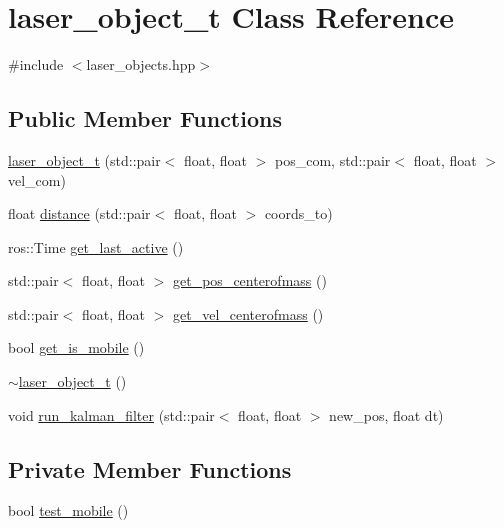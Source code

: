 \hypertarget{classlaser__object__t}{}\section{laser\+\_\+object\+\_\+t Class Reference}
\label{classlaser__object__t}


{\ttfamily \#include $<$laser\+\_\+objects.\+hpp$>$}

\subsection*{Public Member Functions}
\begin{DoxyCompactItemize}
\item 
\hyperlink{classlaser__object__t_a86fb4dc51298aedc38f4dea202e86d94}{laser\+\_\+object\+\_\+t} (std\+::pair$<$ float, float $>$ pos\+\_\+com, std\+::pair$<$ float, float $>$ vel\+\_\+com)
\item 
float \hyperlink{classlaser__object__t_a1306580c845a8e9e37646988d86788c0}{distance} (std\+::pair$<$ float, float $>$ coords\+\_\+to)
\item 
ros\+::\+Time \hyperlink{classlaser__object__t_a85ea7644afff4ac0315156a182946110}{get\+\_\+last\+\_\+active} ()
\item 
std\+::pair$<$ float, float $>$ \hyperlink{classlaser__object__t_a02a018369ba1e52d2cec3625f7452c7b}{get\+\_\+pos\+\_\+centerofmass} ()
\item 
std\+::pair$<$ float, float $>$ \hyperlink{classlaser__object__t_adfafd151af0900623901d162260ba234}{get\+\_\+vel\+\_\+centerofmass} ()
\item 
bool \hyperlink{classlaser__object__t_a5aba73083c62b017d1e09d9e36a35df1}{get\+\_\+is\+\_\+mobile} ()
\item 
\hyperlink{classlaser__object__t_ac9cc27a949e2af39dc4da7fb0fb8f8d4}{$\sim$laser\+\_\+object\+\_\+t} ()
\item 
void \hyperlink{classlaser__object__t_a7197f41117174159f618bbdcd63f9cc3}{run\+\_\+kalman\+\_\+filter} (std\+::pair$<$ float, float $>$ new\+\_\+pos, float dt)
\end{DoxyCompactItemize}
\subsection*{Private Member Functions}
\begin{DoxyCompactItemize}
\item 
bool \hyperlink{classlaser__object__t_aaf5e27005d394ba00082e17a0804f3b2}{test\+\_\+mobile} ()
\end{DoxyCompactItemize}
